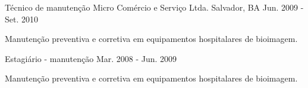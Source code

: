 \begin{cventries}
    
  \cventry
    {Técnico de manutenção} %
    {Micro Comércio e Serviço Ltda.} %
    {Salvador, BA} %
    {Jun. 2009 - Set. 2010} %
    {
      \begin{cvitems} %
        \item {Manutenção preventiva e corretiva em equipamentos hospitalares de bioimagem.}
      \end{cvitems}
    }

  \cventry
    {Estagiário - manutenção} %
    {} %
    {} %
    {Mar. 2008 - Jun. 2009} %
    {
      \begin{cvitems} %
        \item {Manutenção preventiva e corretiva em equipamentos hospitalares de bioimagem.}
      \end{cvitems}
    }


\end{cventries}
